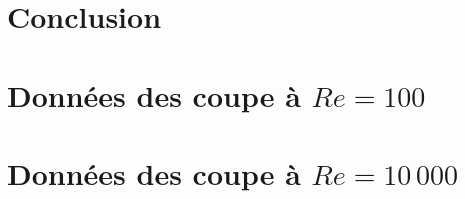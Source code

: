 \documentclass[12pt, letterpaper]{article}
\begin{document}
\section{Conclusion}
	

\clearpage

\appendix

\section{Données des coupe à $Re=100$}
	
	
	
\clearpage
\section{Données des coupe à $Re=10\,000$}
	

\end{document}
